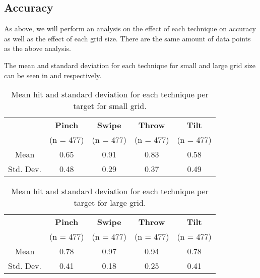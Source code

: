 \subsection{Accuracy}

As above, we will perform an analysis on the effect of each technique on accuracy as well as the effect of each grid size. There are the same amount of data points as the above analysis. 

The mean and standard deviation for each technique for small and large grid size can be seen in  and  respectively. 

\begin{table}[H]
	\centering
	\begin{tabular}{|c|c|c|c|c|}
			\hline
			\rowcolor[HTML]{9B9B9B} 
			& \textbf{Pinch} & \textbf{Swipe} & \textbf{Throw} & \textbf{Tilt} \\
			\rowcolor[HTML]{9B9B9B} 
			 & (n = 477) & (n = 477) & (n = 477) & (n = 477) \\ \hline
			Mean & 0.65         & 0.91          & 0.83          & 0.58         \\ \hline
			Std. Dev. & 0.48 & 0.29 & 0.37 & 0.49 \\ \hline
	\end{tabular}
	\caption{Mean hit  and standard deviation for each technique per target for small grid.}
	\label{tab:meanHitTechniqueSmall}
\end{table}

\begin{table}[H]
	\centering
	\begin{tabular}{|c|c|c|c|c|}
			\hline
			\rowcolor[HTML]{9B9B9B} 
			& \textbf{Pinch} & \textbf{Swipe} & \textbf{Throw} & \textbf{Tilt} \\
			\rowcolor[HTML]{9B9B9B} 
			 & (n = 477) & (n = 477) & (n = 477) & (n = 477) \\ \hline
			Mean & 0.78         & 0.97          & 0.94          & 0.78         \\ \hline
			Std. Dev. & 0.41 & 0.18 & 0.25 & 0.41 \\ \hline
	\end{tabular}
	\caption{Mean hit  and standard deviation for each technique per target for large grid.}
	\label{tab:meanHitTechniqueLarge}
\end{table}


